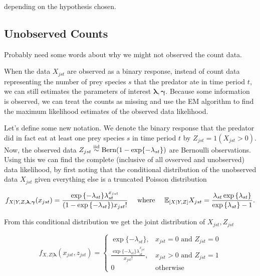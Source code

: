 \noindent depending on the hypothesis chosen.  

\subsection*{Unobserved Counts}

Probably need some words about why we might not observed the count data.  

When the data $X_{jst}$ are observed as a binary response, instead of count data representing the number of prey species $s$ that the predator ate in time period $t$, we can still estimates the parameters of interest $\boldsymbol{\lambda}, \boldsymbol{\gamma}$.  Because some information is observed, we can treat the counts as missing and use the EM algorithm to find the maximum likelihood estimates of the observed data likelihood.  

Let's define some new notation.  We denote the binary response that the predator did in fact eat at least one prey species $s$ in time period $t$ by $Z_{jst} = 1(X_{jst} > 0)$.  Now, the observed data $Z_{jst} \stackrel{\mathrm{iid}}{\sim} \text{Bern}(1-\exp\{-\lambda_{st}\})$ are Bernoulli observations.  Using this we can find the complete (inclusive of all ovserved and unobserved) data likelihood, by first noting that the conditional distribution of the unobserved data $X_{jst}$ given everything else is a truncated Poisson distribution

\begin{equation*}
  f_{X|Y,Z,\boldsymbol{\lambda},\boldsymbol{\gamma}}(x_{jst}) =
  \frac{\exp{\{-\lambda_{st}\}} \lambda_{st}^{x_{jst}}}{(1 - \exp{\{-\lambda_{st}\}}) x_{jst}!} \quad \text{ where } \quad \mathbb{E}_{[X|Y,Z]}X_{jst} = \frac{\lambda_{st} \exp{\{\lambda_{st} \}}}{\exp{\{ \lambda_{st} \}} - 1}.
\end{equation*}

\noindent From this conditional distribution we get the joint distribution of $X_{jst}, Z_{jst}$

\begin{equation*}
    f_{X,Z|\boldsymbol{\lambda}}(x_{jst},z_{jst}) = \left\{
    \begin{array}{lr}
      \exp{\{ -\lambda_{st} \}}, & x_{jst}=0 \mbox{ and } Z_{jst} = 0 \\
      \frac{\exp{\{-\lambda_{st} \}} \lambda_{st}^{x_{jst}}}{x_{jst}!}, & x_{jst} > 0 \mbox{ and } Z_{jst} = 1\\
      0 & \mbox{otherwise}
    \end{array}
  \right.
\end{equation*}

